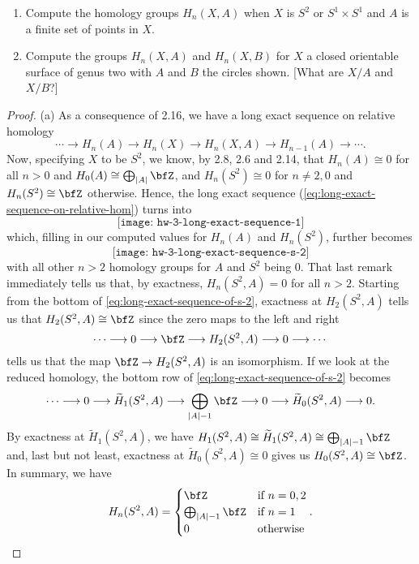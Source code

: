 \begin{problem}[Hatcher {\S}2.1, Ex.\@ 17]
\begin{enumerate}[label=(\alph*)]
\item Compute the homology groups $H_n(X,A)$ when $X$ is $S^2$ or
  $S^1\times S^1$ and $A$ is a finite set of points in $X$.
\item Compute the groups $H_n(X,A)$ and $H_n(X,B)$ for $X$ a closed
  orientable surface of genus two with $A$ and $B$ the circles shown. [What
  are $X/A$ and $X/B$?]
\end{enumerate}
\end{problem}
\begin{proof}
(a) As a consequence of 2.16, we have a long exact sequence on relative
homology
\begin{equation}
\label{eq:long-exact-sequence-on-relative-hom}
\cdots\longrightarrow
H_n(A)\longrightarrow
H_n(X)\longrightarrow
H_n(X,A)\longrightarrow
H_{n-1}(A)\longrightarrow
\cdots.
\end{equation}
Now, specifying $X$ to be $S^2$, we know, by 2.8, 2.6 and 2.14, that
$H_n(A)\cong 0$ for all $n>0$ and $H_0(A)\cong \bigoplus_{|A|}\bfZ$, and
$H_n(S^2)\cong 0$ for $n\neq 2,0$ and $H_n(S^2)\cong\bfZ$ otherwise. Hence,
the long exact sequence (\ref{eq:long-exact-sequence-on-relative-hom})
turns into
\begin{equation}
\label{eq:long-exact-sequence}
\texttt{[image: hw-3-long-exact-sequence-1]}
\end{equation}
which, filling in our computed values for $H_n(A)$ and $H_n(S^2)$, further
becomes
\begin{equation}
\label{eq:long-exact-sequence-of-s-2}
\texttt{[image: hw-3-long-exact-sequence-s-2]}
\end{equation}
with all other $n>2$ homology groups for $A$ and $S^2$ being $0$. That last
remark immediately tells us that, by exactness, $H_n(S^2,A)=0$ for all
$n>2$. Starting from the bottom of \eqref{eq:long-exact-sequence-of-s-2},
exactness at $H_2(S^2,A)$ tells us that $H_2(S^2,A)\cong\bfZ$ since the
zero maps to the left and right
\[
\cdots\longrightarrow 0\longrightarrow \bfZ\longrightarrow H_2(S^2,A)\longrightarrow 0\longrightarrow\cdots
\]
tells us that the map $\bfZ\to H_2(S^2,A)$ is an isomorphism. If we look at
the reduced homology, the bottom row of
\eqref{eq:long-exact-sequence-of-s-2} becomes
\[
\cdots\longrightarrow
0\longrightarrow
\widetilde H_1(S^2,A)\longrightarrow
\bigoplus_{|A|-1}\bfZ\longrightarrow
0\longrightarrow\widetilde H_0(S^2,A)
\longrightarrow 0.
\]
By exactness at $\widetilde H_1(S^2,A)$, we have $H_1(S^2,A)\cong\widetilde
H_1(S^2,A)\cong\bigoplus_{|A|-1}\bfZ$ and, last but not least, exactness at
$\widetilde H_0(S^2,A)\cong 0$ gives us $H_0(S^2,A)\cong\bfZ$. In summary,
we have
\begin{equation}
  \label{eq:homology-of-s-2-a}
H_n(S^2,A)=
\begin{cases}
\bfZ&\text{if $n=0,2$}\\
\bigoplus_{|A|-1}\bfZ&\text{if $n=1$}\\
0&\text{otherwise}
\end{cases}.
\end{equation}


\end{proof}

